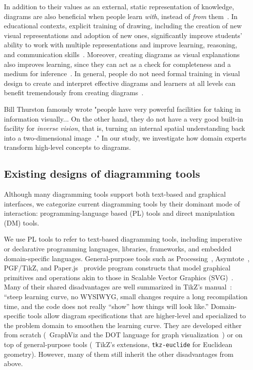 In addition to their values as an external, static representation of knowledge, diagrams are also beneficial when people learn \emph{with}, instead of \emph{from} them~\cite{learningWithRepresentations}.
In educational contexts, explicit training of drawing, including the creation of new visual representations and adoption of new ones, significantly improve students' ability to work with multiple representations and improve learning, reasoning, and communication skills~\cite{drawingToLearn}. Moreover, creating diagrams as visual explanations also improves learning, since they can act as a check for completeness and a medium for inference~\cite{VisualexplanationsImprovesLearning}. In general, people do not need formal training in visual design to create and interpret effective diagrams and learners at all levels can benefit tremendously from creating diagrams~\cite{ABC}.

Bill Thurston famously wrote "people have very powerful facilities for taking in information visually... On the other hand, they do not have a very good built-in facility for \emph{inverse vision}, that is, turning an internal spatial understanding back into a two-dimensional image~\cite{billThurston}." In our study, we investigate how domain experts transform high-level concepts to diagrams.

\subsection{Existing designs of diagramming tools}

Although many diagramming tools support both text-based and graphical interfaces, we categorize current diagramming tools by their dominant mode of interaction: programming-language based (PL) tools and direct manipulation (DM) tools. 

We use PL tools to refer to text-based diagramming tools, including imperative or declarative programming languages, libraries, frameworks, and embedded domain-specific languages. General-purpose tools such as Processing~\cite{processing}, Asymtote~\cite{asymptote}, PGF/TikZ, and Paper.js~ provide program constructs that model graphical primitives and operations akin to those in Scalable Vector Graphics (SVG)~\cite{SVGStandard}. Many of their shared disadvantages are well summarized in TikZ's manual~\cite{TikZ-Manual}: ``steep learning curve, no WYSIWYG, small changes require a long recompilation time, and the code does not really ``show'' how things will look like.'' Domain-specific tools allow diagram specifications that are higher-level and specialized to the problem domain to smoothen the learning curve. They are developed either from scratch (\eg~GraphViz and the DOT language for graph visualization~\cite{Graphviz}) or on top of general-purpose tools (\eg~TikZ's extensions, \texttt{tkz-euclide} for Euclidean geometry). However, many of them still inherit the other disadvantages from above. 

